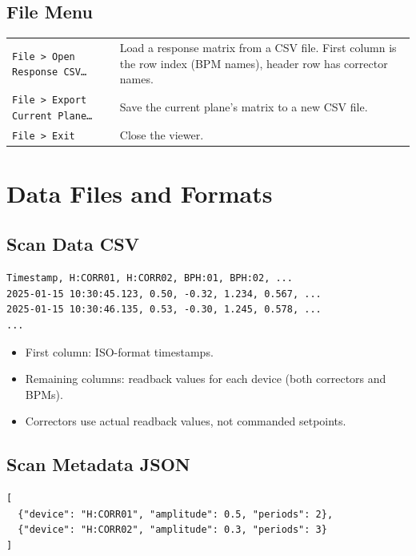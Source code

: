 \documentclass[11pt,a4paper,twoside]{report}
\newcommand{\menupath}[1]{\texttt{\small #1}}
\begin{document}
\section{File Menu}

\begin{tabularx}{\textwidth}{lX}
  \toprule
  \menupath{File > Open Response CSV\ldots} & Load a response matrix from a CSV file. First column is the row index (BPM names), header row has corrector names. \\
  \menupath{File > Export Current Plane\ldots} & Save the current plane's matrix to a new CSV file. \\
  \menupath{File > Exit} & Close the viewer. \\
  \bottomrule
\end{tabularx}


\chapter{Data Files and Formats}\label{ch:data}

\section{Scan Data CSV}

\begin{lstlisting}
Timestamp, H:CORR01, H:CORR02, BPH:01, BPH:02, ...
2025-01-15 10:30:45.123, 0.50, -0.32, 1.234, 0.567, ...
2025-01-15 10:30:46.135, 0.53, -0.30, 1.245, 0.578, ...
...
\end{lstlisting}

\begin{itemize}
  \item First column: ISO-format timestamps.
  \item Remaining columns: readback values for each device (both correctors and BPMs).
  \item Correctors use actual readback values, not commanded setpoints.
\end{itemize}

\section{Scan Metadata JSON}

\begin{lstlisting}
[
  {"device": "H:CORR01", "amplitude": 0.5, "periods": 2},
  {"device": "H:CORR02", "amplitude": 0.3, "periods": 3}
]
\end{lstlisting}
\end{document}
